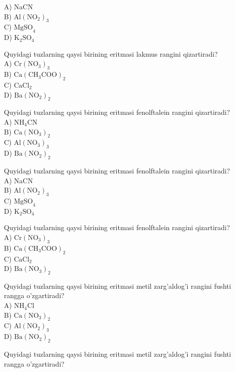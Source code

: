 A) NaCN\\
B) $\mathrm{Al}\left(\mathrm{NO}_{2}\right)_{3}$\\
C) $\mathrm{MgSO}_{4}$\\
D) $\mathrm{K}_{2} \mathrm{SO}_{4}$
  \item Quyidagi tuzlarning qaysi birining eritmasi lakmus rangini qizartiradi?\\
A) $\mathrm{Cr}\left(\mathrm{NO}_{3}\right)_{3}$\\
B) $\mathrm{Ca}\left(\mathrm{CH}_{3} \mathrm{COO}\right)_{2}$\\
C) $\mathrm{CaCl}_{2}$\\
D) $\mathrm{Ba}\left(\mathrm{NO}_{2}\right)_{2}$
  \item Quyidagi tuzlarning qaysi birining eritmasi fenolftalein rangini qizartiradi?\\
A) $\mathrm{NH}_{4} \mathrm{CN}$\\
B) $\mathrm{Ca}\left(\mathrm{NO}_{3}\right)_{2}$\\
C) $\mathrm{Al}\left(\mathrm{NO}_{3}\right)_{3}$\\
D) $\mathrm{Ba}\left(\mathrm{NO}_{2}\right)_{2}$
  \item Quyidagi tuzlarning qaysi birining eritmasi fenolftalein rangini qizartiradi?\\
A) NaCN\\
B) $\mathrm{Al}\left(\mathrm{NO}_{2}\right)_{3}$\\
C) $\mathrm{MgSO}_{4}$\\
D) $\mathrm{K}_{2} \mathrm{SO}_{4}$
  \item Quyidagi tuzlarning qaysi birining eritmasi fenolftalein rangini qizartiradi?\\
A) $\mathrm{Cr}\left(\mathrm{NO}_{3}\right)_{3}$\\
B) $\mathrm{Ca}\left(\mathrm{CH}_{3} \mathrm{COO}\right)_{2}$\\
C) $\mathrm{CaCl}_{2}$\\
D) $\mathrm{Ba}\left(\mathrm{NO}_{3}\right)_{2}$
  \item Quyidagi tuzlarning qaysi birining eritmasi metil zarg'aldog'i rangini fushti rangga o'zgartiradi?\\
A) $\mathrm{NH}_{4} \mathrm{Cl}$\\
B) $\mathrm{Ca}\left(\mathrm{NO}_{3}\right)_{2}$\\
C) $\mathrm{Al}\left(\mathrm{NO}_{2}\right)_{3}$\\
D) $\mathrm{Ba}\left(\mathrm{NO}_{2}\right)_{2}$
  \item Quyidagi tuzlarning qaysi birining eritmasi metil zarg'aldog'i rangini fushti rangga o'zgartiradi?\\
